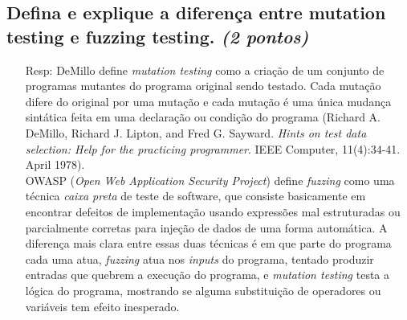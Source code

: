 \documentclass[paper=a4, fontsize=11pt]{scrartcl} %
\numberwithin{equation}{section} %
\numberwithin{figure}{section} %
\numberwithin{table}{section} %
\begin{document}
\subsection{Defina e explique a diferença entre mutation testing e fuzzing testing. \textit{(2 pontos)}}
	\begin{itemize}
		\item[Resp:] DeMillo define \textit{mutation testing} como a criação de um conjunto de programas mutantes do programa original sendo testado. Cada mutação difere do original por uma mutação e cada mutação é uma única mudança sintática feita em uma declaração ou condição do programa (Richard A. DeMillo, Richard J. Lipton, and Fred G. Sayward. \textit{Hints on test data selection: Help for the practicing programmer}. IEEE Computer, 11(4):34-41. April 1978).\\
		OWASP (\textit{Open Web Application Security Project}) define \textit{fuzzing} como uma técnica \textit{caixa preta} de teste de software, que consiste basicamente em encontrar defeitos de implementação usando expressões mal estruturadas ou parcialmente corretas para injeção de dados de uma forma automática.
		A diferença mais clara entre essas duas técnicas é em que parte do programa cada uma atua, \textit{fuzzing} atua nos \textit{inputs} do programa, tentado produzir entradas que quebrem a execução do programa, e \textit{mutation testing} testa a lógica do programa, mostrando se alguma substituição de operadores ou variáveis tem efeito inesperado.
	\end{itemize}

\pagebreak
\end{document}
